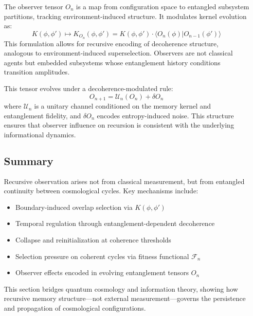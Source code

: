 The observer tensor \( O_n \) is a map from configuration space to entangled subsystem partitions, tracking environment-induced structure. It modulates kernel evolution as:
\[
K(\phi, \phi') \mapsto K_{O_n}(\phi, \phi') = K(\phi, \phi') \cdot \langle O_n(\phi) | O_{n-1}(\phi') \rangle
\]
This formulation allows for recursive encoding of decoherence structure, analogous to environment-induced superselection. Observers are not classical agents but embedded subsystems whose entanglement history conditions transition amplitudes.

This tensor evolves under a decoherence-modulated rule:
\[
O_{n+1} = \mathcal{U}_n(O_n) + \delta O_n
\]
where \( \mathcal{U}_n \) is a unitary channel conditioned on the memory kernel and entanglement fidelity, and \( \delta O_n \) encodes entropy-induced noise. This structure ensures that observer influence on recursion is consistent with the underlying informational dynamics.

\subsection{Summary}

Recursive observation arises not from classical measurement, but from entangled continuity between cosmological cycles. Key mechanisms include:

\begin{itemize}
    \item Boundary-induced overlap selection via \( K(\phi, \phi') \)
    \item Temporal regulation through entanglement-dependent decoherence
    \item Collapse and reinitialization at coherence thresholds
    \item Selection pressure on coherent cycles via fitness functional \( \mathcal{F}_n \)
    \item Observer effects encoded in evolving entanglement tensors \( O_n \)
\end{itemize}

This section bridges quantum cosmology and information theory, showing how recursive memory structure—not external measurement—governs the persistence and propagation of cosmological configurations.
